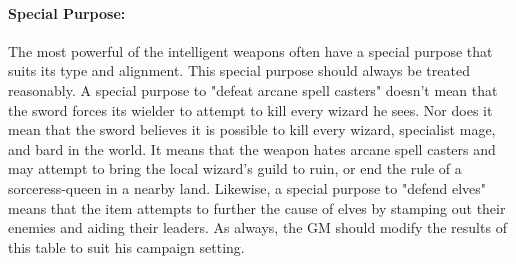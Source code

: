 \begin{multicols}{2}
\begin{minipage}{\columnwidth}
\end{minipage}

\paragraph{Special Purpose:} The most powerful of the intelligent weapons often have a special purpose that suits its type and alignment.  This special purpose should always be treated reasonably.  A special purpose to "defeat arcane spell casters" doesn't mean that the sword forces its wielder to attempt to kill every wizard he sees.  Nor does it mean that the sword believes it is possible to kill every wizard, specialist mage, and bard in the world.  It means that the weapon hates arcane spell casters and may attempt to bring the local wizard's guild to ruin, or end the rule of a sorceress-queen in a nearby land.  Likewise, a special purpose to "defend elves" means that the item attempts to further the cause of elves by stamping out their enemies and aiding their leaders.  As always, the GM should modify the results of this table to suit his campaign setting.

\noindent \begin{minipage}{\columnwidth}


\end{minipage}
\end{multicols}

